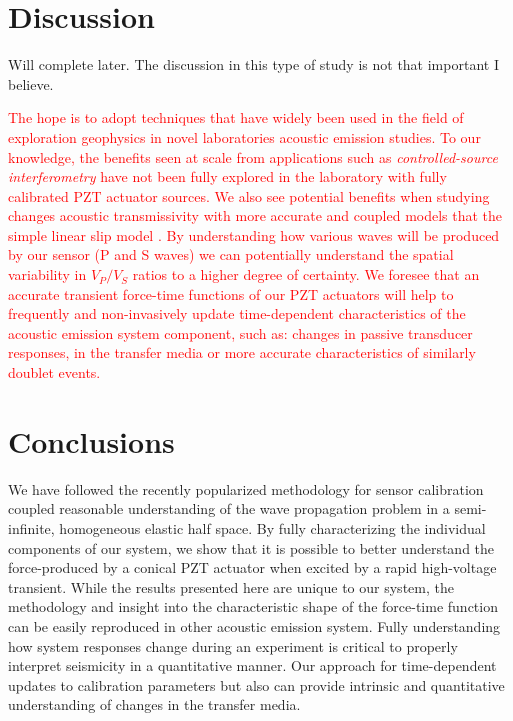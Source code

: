 \documentclass[preprint,3p, 11pt,authoryear]{elsarticle}
\begin{document}
\section{Discussion}

Will complete later.  The discussion in this type of study is not that important I believe.

\textcolor{red}{The hope is to adopt techniques that have widely been used in the field of exploration geophysics in novel laboratories acoustic emission studies. To our knowledge, the benefits seen at scale from applications such as \textit{controlled-source interferometry} have not been fully explored in the laboratory with fully calibrated PZT actuator sources. We also see potential benefits when studying changes acoustic transmissivity \citep{PyrakNolte1980} with more accurate and coupled models that the simple linear slip model \citep[LSM,][]{Kendall1957}.  By understanding how various waves will be produced by our sensor (P and S waves) we can potentially understand the spatial variability in $V_{P}/V_{S}$ ratios to a higher degree of certainty. We foresee that an accurate transient force-time functions of our PZT actuators will help to frequently and non-invasively update time-dependent characteristics of the acoustic emission system component, such as: changes in passive transducer responses, in the transfer media or more accurate characteristics of similarly doublet events.} 

\section{Conclusions}
We have followed the recently popularized methodology for sensor calibration coupled reasonable understanding of the wave propagation problem in a semi-infinite, homogeneous elastic half space. By fully characterizing the individual components of our system, we show that it is possible to better understand the force-produced by a conical PZT actuator when excited by a rapid high-voltage transient. While the results presented here are unique to our system, the methodology and insight into the characteristic shape of the force-time function can be easily reproduced in other acoustic emission system. Fully understanding how system responses change during an experiment is critical to properly interpret seismicity in a quantitative manner. Our approach for time-dependent updates to calibration parameters but also can provide intrinsic and quantitative understanding of changes in the transfer media.
\end{document}
